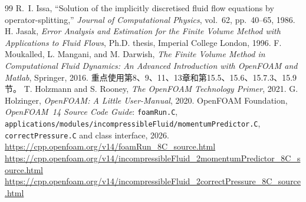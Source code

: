 \documentclass[UTF8,12pt,a4paper]{ctexart}
\numberwithin{equation}{section}
\begin{document}
\begin{thebibliography}{99}
R.~I. Issa,
“Solution of the implicitly discretised fluid flow equations by operator-splitting,”
\emph{Journal of Computational Physics}, vol.~62, pp.~40--65, 1986.
H. Jasak,
\emph{Error Analysis and Estimation for the Finite Volume Method with Applications to Fluid Flows},
Ph.D. thesis, Imperial College London, 1996.
F. Moukalled, L. Mangani, and M. Darwish,
\emph{The Finite Volume Method in Computational Fluid Dynamics: An Advanced Introduction with OpenFOAM and Matlab},
Springer, 2016. 重点使用第8、9、11、13章和第15.5、15.6、15.7.3、15.9节。
T. Holzmann and S. Rooney, \emph{The OpenFOAM Technology Primer}, 2021.
G. Holzinger, \emph{OpenFOAM: A Little User-Manual}, 2020.
OpenFOAM Foundation, \emph{OpenFOAM~14 Source Code Guide}: 
\texttt{foamRun.C}, \texttt{applications/modules/incompressibleFluid/momentumPredictor.C},
\texttt{correctPressure.C} and class interface, 2026.\\
\url{https://cpp.openfoam.org/v14/foamRun_8C_source.html}\\
\url{https://cpp.openfoam.org/v14/incompressibleFluid_2momentumPredictor_8C_source.html}\\
\url{https://cpp.openfoam.org/v14/incompressibleFluid_2correctPressure_8C_source.html}
\end{thebibliography}
\end{document}
